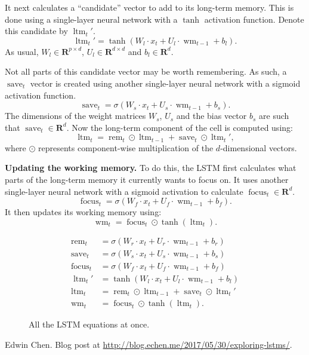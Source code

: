 \documentclass[12pt]{article}
\theoremstyle{definition}
\newcommand{\R}{\ensuremath{\bm{R}}}
\DeclareMathOperator{\rem}{rem}
\DeclareMathOperator{\save}{save}
\DeclareMathOperator{\focus}{focus}
\DeclareMathOperator{\ltm}{ltm}
\DeclareMathOperator{\wm}{wm}
\begin{document}
It next calculates a ``candidate'' vector to add to its long-term memory. This 
is done using a single-layer neural network with a $\tanh$ activation function.
Denote this candidate by $\ltm_{t}'$.
\begin{equation}
\ltm_{t}' = \tanh \left ( W_l \cdot x_t + U_l \cdot \wm_{t - 1} + b_l \right ). 
\end{equation} 
As usual, $W_l \in \R^{p \times d}$, $U_l \in \R^{d \times d}$ and $b_l \in \R^{d}$. 

Not all parts of this candidate vector may be worth remembering. As such, a 
$\save_{t}$ vector is created using another single-layer neural network with a 
sigmoid activation function. 
\begin{equation}
\save_{t} = \sigma \left ( W_s \cdot x_t + U_s \cdot \wm_{t - 1} + b_s \right ). 
\end{equation} 
The dimensions of the weight matrices $W_s$, $U_s$ and the bias vector $b_s$ 
are such that $\save_{t} \in \R^{d}$.
Now the long-term component of the cell is computed using:
\begin{equation}
\ltm_{t} = \rem_{t} \odot \ltm_{t - 1} + \save_{t} \odot \ltm_{t}',
\end{equation} 
where $\odot$ represents component-wise multiplication of the $d$-dimensional 
vectors.

\medskip
\noindent \textbf{Updating the working memory.} To do this, the LSTM first 
calculates what parts of the long-term memory it currently wants to focus on. 
It uses another single-layer neural network with a sigmoid activation to 
calculate $\focus_{t} \in \R^{d}$. 
\begin{equation}
\focus_{t} = \sigma \left ( W_f \cdot x_t + U_f \cdot \wm_{t - 1} + b_f \right ). 
\end{equation} 
It then updates its working memory using:
\begin{equation}
\wm_{t} = \focus_{t} \odot \tanh(\ltm_{t}).
\end{equation} 


\begin{figure}[ht]
\begin{tcolorbox}
\begin{align*}
    \rem_{t}   & = \sigma \left ( W_r \cdot x_t + U_r \cdot \wm_{t - 1} + b_r \right ) \\
    \save_{t}  & = \sigma \left ( W_s \cdot x_t + U_s \cdot \wm_{t - 1} + b_s \right ) \\
    \focus_{t} & = \sigma \left ( W_f \cdot x_t + U_f \cdot \wm_{t - 1} + b_f \right ) \\
    \ltm_{t}'  & = \tanh \left ( W_l \cdot x_t + U_l \cdot \wm_{t - 1} + b_l \right ) \\
    \ltm_{t}   & = \rem_{t} \odot \ltm_{t - 1} + \save_{t} \odot \ltm_{t}' \\
    \wm_{t}    & = \focus_{t} \odot \tanh(\ltm_{t}).
\end{align*}
\end{tcolorbox}
\caption{All the LSTM equations at once.}
\end{figure}



 Edwin Chen. Blog post at 
\url{http://blog.echen.me/2017/05/30/exploring-lstms/}.
\end{document}

